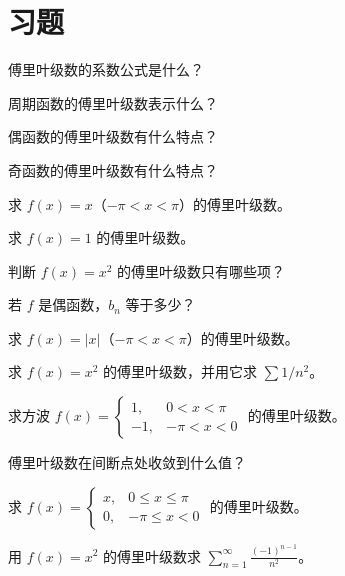 \section{习题}
\begin{exercise}[0] 傅里叶级数的系数公式是什么？\end{exercise}
\begin{exercise}[0] 周期函数的傅里叶级数表示什么？\end{exercise}
\begin{exercise}[0] 偶函数的傅里叶级数有什么特点？\end{exercise}
\begin{exercise}[0] 奇函数的傅里叶级数有什么特点？\end{exercise}
\begin{exercise}[1] 求 \(f(x)=x\)（\(-\pi<x<\pi\)）的傅里叶级数。\end{exercise}
\begin{exercise}[1] 求 \(f(x)=1\) 的傅里叶级数。\end{exercise}
\begin{exercise}[1] 判断 \(f(x)=x^2\) 的傅里叶级数只有哪些项？\end{exercise}
\begin{exercise}[1] 若 \(f\) 是偶函数，\(b_n\) 等于多少？\end{exercise}
\begin{exercise}[2] 求 \(f(x)=|x|\)（\(-\pi<x<\pi\)）的傅里叶级数。\end{exercise}
\begin{exercise}[2] 求 \(f(x)=x^2\) 的傅里叶级数，并用它求 \(\sum 1/n^2\)。\end{exercise}
\begin{exercise}[2] 求方波 \(f(x)=\begin{cases}1,&0<x<\pi\\-1,&-\pi<x<0\end{cases}\) 的傅里叶级数。\end{exercise}
\begin{exercise}[2] 傅里叶级数在间断点处收敛到什么值？\end{exercise}
\begin{exercise}[3] 求 \(f(x)=\begin{cases}x,&0\le x\le\pi\\0,&-\pi\le x<0\end{cases}\) 的傅里叶级数。\end{exercise}
\begin{exercise}[3] 用 \(f(x)=x^2\) 的傅里叶级数求 \(\sum_{n=1}^\infty \frac{(-1)^{n-1}}{n^2}\)。\end{exercise}
